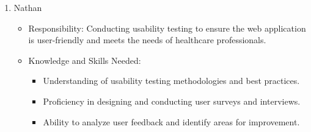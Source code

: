\documentclass[12pt, titlepage]{article}
\begin{document}
\begin{enumerate}
\begin{enumerate}
  \begin{itemize}
      \item[-] Responsibility: Developing effective data visualization techniques for medical data analysis and assisting in web interface development.
      \item[-] Knowledge and Skills Needed:
      \begin{itemize}
          \item Proficiency in data visualization libraries (e.g., Matplotlib, Seaborn, Plotly).
          \item Understanding of usability testing methodologies for web applications.
          \item Frontend development skills (e.g., React, Angular) for web interface testing.
      \end{itemize}
      \item[-] Approaches to Acquiring Skills:
      \begin{itemize}
          \item Online Tutorials and Documentation: Learning visualization libraries through official documentation and community tutorials.
          \item Case Studies and Best Practices: Studying case studies on effective medical data visualization and user interface design.
      \end{itemize}
      \item[-] Chosen Approach: Ayman will pursue the Case Studies and Best Practices approach.
      \item[-] Reason for Choice: By understanding how visualization is effectively used in existing medical applications, Ayman can apply proven techniques to our project. This approach also aids in designing user-friendly interfaces, crucial for the V\&V plan's usability testing component.
  \end{itemize}

  \item Nathan 

  \begin{itemize}
      \item[-] Responsibility: Conducting usability testing to ensure the web application is user-friendly and meets the needs of healthcare professionals.
      
      \item[-]Knowledge and Skills Needed:
      \begin{itemize}
          \item Understanding of usability testing methodologies and best practices.
          \item Proficiency in designing and conducting user surveys and interviews.
          \item Ability to analyze user feedback and identify areas for improvement.
      \end{itemize}
      

\end{itemize}
\end{enumerate}
\end{enumerate}
\end{document}

